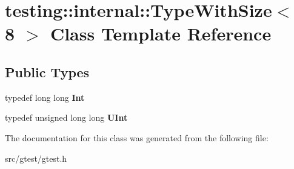 \hypertarget{classtesting_1_1internal_1_1_type_with_size_3_018_01_4}{}\section{testing\+:\+:internal\+:\+:Type\+With\+Size$<$ 8 $>$ Class Template Reference}
\label{classtesting_1_1internal_1_1_type_with_size_3_018_01_4}
\subsection*{Public Types}
\begin{DoxyCompactItemize}
\item 
\mbox{\label{classtesting_1_1internal_1_1_type_with_size_3_018_01_4_a36d5697e5f5254b0495f13c97d747e36}} 
typedef long long {\bfseries Int}
\item 
\mbox{\label{classtesting_1_1internal_1_1_type_with_size_3_018_01_4_a747e21c5aee8faf07ec65cd4c3d1ca62}} 
typedef unsigned long long {\bfseries U\+Int}
\end{DoxyCompactItemize}


The documentation for this class was generated from the following file\+:\begin{DoxyCompactItemize}
\item 
src/gtest/gtest.\+h\end{DoxyCompactItemize}
